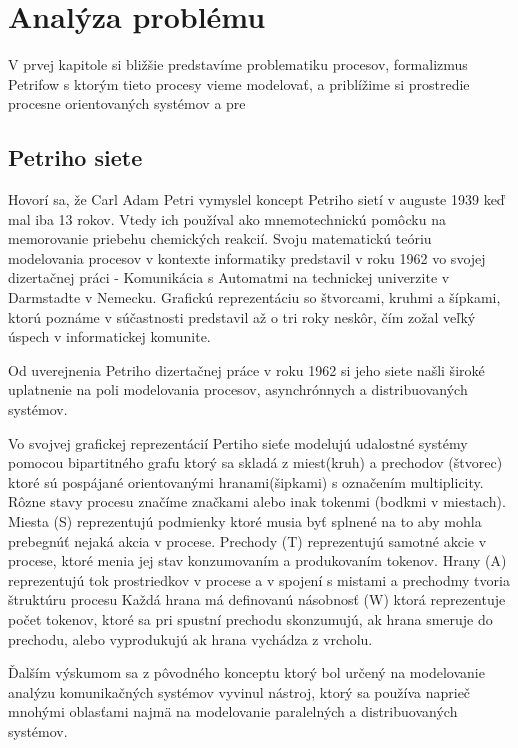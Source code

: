 
\section{Analýza problému}
V prvej kapitole si bližšie predstavíme problematiku procesov, formalizmus Petrifow s ktorým tieto procesy vieme modelovať, a priblížime si prostredie procesne orientovaných systémov a pre

\subsection{Petriho siete}
Hovorí sa, že Carl Adam Petri vymyslel koncept Petriho sietí v auguste 1939 keď mal iba 13 rokov. Vtedy ich používal ako mnemotechnickú pomôcku na memorovanie priebehu chemických reakcií. Svoju matematickú teóriu modelovania procesov v kontexte informatiky predstavil v roku 1962 vo svojej dizertačnej práci - Komunikácia s Automatmi na technickej univerzite v Darmstadte v Nemecku. Grafickú reprezentáciu so štvorcami, kruhmi a šípkami, ktorú poznáme v súčastnosti predstavil až o tri roky neskôr, čím zožal veľký úspech v informatickej komunite. \cite{petri50years} 

Od uverejnenia Petriho dizertačnej práce v roku 1962 si jeho siete našli široké uplatnenie na poli modelovania procesov, asynchrónnych a distribuovaných systémov. 

Vo svojvej grafickej reprezentácií Pertiho sieťe modelujú udalostné systémy pomocou bipartitného grafu ktorý sa skladá z miest(kruh) a prechodov (štvorec) ktoré sú pospájané orientovanými hranami(šipkami) s označením multiplicity. Rôzne stavy procesu značíme značkami alebo inak tokenmi (bodkmi v miestach). 
Miesta (S) reprezentujú podmienky ktoré musia byť splnené na to aby mohla prebegnúť nejaká akcia v procese.
Prechody (T) reprezentujú samotné akcie v procese, ktoré menia jej stav konzumovaním a produkovaním tokenov.
Hrany (A) reprezentujú tok prostriedkov v procese a v spojení s mistami a prechodmy tvoria štruktúru procesu
Každá hrana má definovanú násobnosť (W) ktorá reprezentuje počet tokenov, ktoré sa pri spustní prechodu skonzumujú, ak hrana smeruje do prechodu, alebo vyprodukujú ak hrana vychádza z vrcholu. 









  Ďalším výskumom sa z pôvodného konceptu ktorý bol určený na modelovanie analýzu komunikačných systémov vyvinul nástroj, ktorý sa používa naprieč mnohými oblasťami najmä na modelovanie paralelných a distribuovaných systémov.


